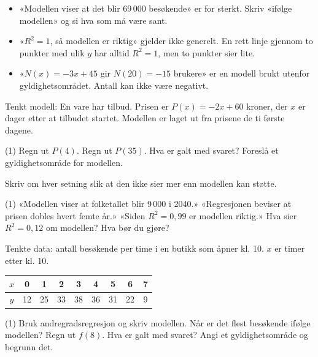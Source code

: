 \begin{vanligfeil}
\begin{itemize}[leftmargin=1.2em,itemsep=1pt,topsep=0pt]
  \item «Modellen viser at det blir 69\,000 besøkende» er for sterkt. Skriv «ifølge modellen» og si hva som må være sant.
  \item «$R^2 = 1$, så modellen er riktig» gjelder ikke generelt. En rett linje gjennom to punkter med ulik $y$ har alltid $R^2 = 1$, men to punkter sier lite.
  \item «$N(x) = -3x + 45$ gir $N(20) = -15$ brukere» er en modell brukt utenfor gyldighetsområdet. Antall kan ikke være negativt.
\end{itemize}
\end{vanligfeil}


Tenkt modell: En vare har tilbud. Prisen er $P(x) = -2x + 60$ kroner, der $x$ er dager etter at tilbudet startet.
Modellen er laget ut fra prisene de ti første dagene.
\begin{tasks}(1)
  \task Regn ut $P(4)$.
  \task Regn ut $P(35)$. Hva er galt med svaret?
  \task Foreslå et gyldighetsområde for modellen.
\end{tasks}

Skriv om hver setning slik at den ikke sier mer enn modellen kan støtte.
\begin{tasks}(1)
  \task «Modellen viser at folketallet blir 9\,000 i 2040.»
  \task «Regresjonen beviser at prisen dobles hvert femte år.»
  \task «Siden $R^2 = 0{,}99$ er modellen riktig.»
  \task Hva sier $R^2 = 0{,}12$ om modellen? Hva bør du gjøre?
\end{tasks}


Tenkte data: antall besøkende per time i en butikk som åpner kl. 10. $x$ er timer etter kl. 10.

\smallskip
\begin{tabular}{@{}c|cccccccc@{}}
$x$ & 0 & 1 & 2 & 3 & 4 & 5 & 6 & 7\\ \hline
$y$ & 12 & 25 & 33 & 38 & 36 & 31 & 22 & 9\\
\end{tabular}

\begin{tasks}(1)
  \task Bruk andregradsregresjon og skriv modellen.
  \task Når er det flest besøkende ifølge modellen?
  \task Regn ut $f(8)$. Hva er galt med svaret?
  \task Angi et gyldighetsområde og begrunn det.
\end{tasks}

